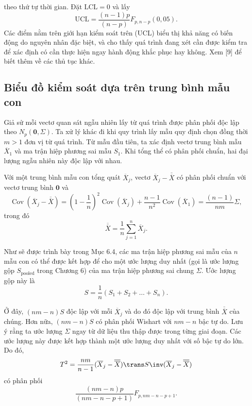 \noindent theo thứ tự thời gian. Đặt $\mathrm{LCL}=0$ và lấy
\begin{equation*}
    \mathrm{UCL} = \frac{(n-1)p}{(n-p)}F_{p,n-p}(0{,}05).
\end{equation*}
Các điểm nằm trên giới hạn kiểm soát trên (UCL) biểu thị khả năng có biến động do nguyên nhân đặc biệt, và cho thấy quá trình đang xét cần được kiểm tra để xác định có cần thực hiện ngay hành động khắc phục hay không. Xem [9] để biết thêm về các thủ tục khác.

\subsection*{\textbf{Biểu đồ kiểm soát dựa trên trung bình mẫu con}}

Giả sử mỗi vectơ quan sát ngẫu nhiên lấy từ quá trình được phân phối độc lập theo $N_{p}(\mathbf{0},\Sigma)$. Ta xử lý khác đi khi quy trình lấy mẫu quy định chọn đồng thời $m>1$ đơn vị từ quá trình. Từ mẫu đầu tiên, ta xác định vectơ trung bình mẫu $\overline{X}_{1}$ và ma trận hiệp phương sai mẫu $S_{1}$. Khi tổng thể có phân phối chuẩn, hai đại lượng ngẫu nhiên này độc lập với nhau.

Với một trung bình mẫu con tổng quát $\overline{X}_{j}$, vectơ $\overline{X}_{j} - \overline{\overline{X}}$ có phân phối chuẩn với vectơ trung bình $\mathbf{0}$ và
\begin{equation*}
    \operatorname{Cov}(\overline{X}_{j}-\overline{\overline{X}}) = \left(1-\frac{1}{n}\right)^{2}\operatorname{Cov}(\overline{X}_{j}) + \frac{n-1}{n^{2}}\operatorname{Cov}(\overline{X}_{1}) = \frac{(n-1)}{nm}\Sigma,
\end{equation*}
trong đó
\begin{equation*}
    \overline{\overline{X}} = \frac{1}{n}\sum_{j=1}^{n}\overline{X}_{j}.
\end{equation*}

Như sẽ được trình bày trong Mục 6.4, các ma trận hiệp phương sai mẫu của $n$ mẫu con có thể được kết hợp để cho một ước lượng duy nhất (gọi là ước lượng gộp $S_{\mathrm{pooled}}$ trong Chương 6) của ma trận hiệp phương sai chung $\Sigma$. Ước lượng gộp này là
\begin{equation*}
    S = \frac{1}{n}(S_{1} + S_{2} + \dots + S_{n}).
\end{equation*}

Ở đây, $(nm-n)S$ độc lập với mỗi $\overline{X}_{j}$ và do đó độc lập với trung bình $\overline{\overline{X}}$ của chúng. Hơn nữa, $(nm-n)S$ có phân phối Wishart với $nm-n$ bậc tự do. Lưu ý rằng ta ước lượng $\Sigma$ ngay từ dữ liệu thu thập được trong từng giai đoạn. Các ước lượng này được kết hợp thành một ước lượng duy nhất với số bậc tự do lớn. Do đó,
\begin{equation*}
    T^{2} = \frac{nm}{n-1}(\overline{X}_{j}-\overline{\overline{X}})\trans S\inv(\overline{X}_{j}-\overline{\overline{X}})
\end{equation*}
có phân phối
\begin{equation}
    \frac{(nm-n)p}{(nm-n-p+1)}F_{p, nm-n-p+1}.
    \tag{5-35}
    \label{eq:5-35}
\end{equation}

